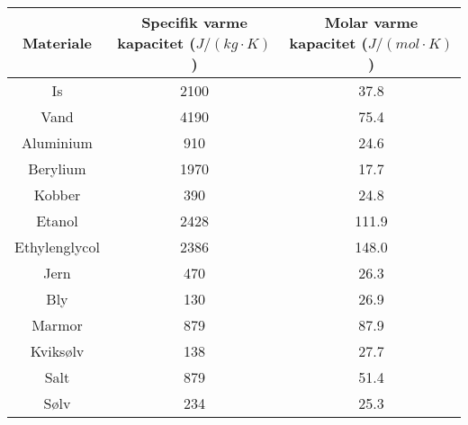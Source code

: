 \begin{tabular}{|c|c|c|}
	\hline
	Materiale&Specifik varme kapacitet ($J/(kg\cdot K)$)&Molar varme kapacitet ($J/(mol\cdot K)$)\\
	\hline
	Is&2100&37.8\\
	Vand&4190&75.4\\
	Aluminium&910&24.6\\
	Berylium&1970&17.7\\
	Kobber&390&24.8\\
	Etanol&2428&111.9\\
	Ethylenglycol&2386&148.0\\
	Jern&470&26.3\\
	Bly&130&26.9\\
	Marmor&879&87.9\\
	Kviksølv&138&27.7\\
	Salt&879&51.4\\
	Sølv&234&25.3\\
	\hline
\end{tabular}